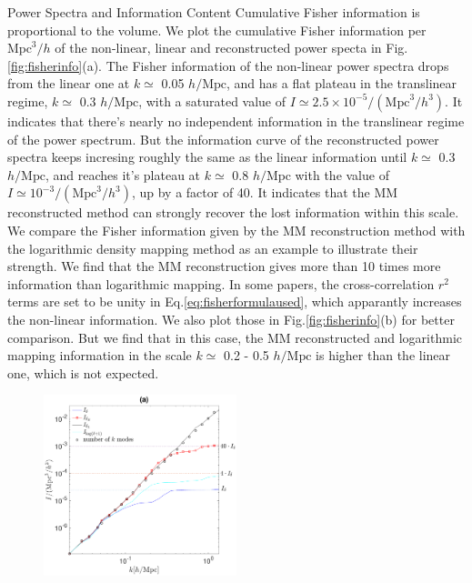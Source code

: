 \begin{section}{Power Spectra and Information Content}
  Cumulative Fisher information is proportional to the volume. We plot the 
cumulative Fisher information per $\mathrm{Mpc}^3/h$ of the non-linear, linear and reconstructed power specta in 
Fig.\ref{fig:fisherinfo}(a). The Fisher information of the non-linear power spectra drops 
from the linear one at $k \simeq$ 0.05 $h/\mathrm{Mpc}$, and has a flat plateau in the translinear regime, 
$k\simeq$ 0.3 $h/\mathrm{Mpc}$, with 
a saturated value of $I \simeq 2.5 \times 10^{-5}/(\mathrm{Mpc}^3/h^3)$. It 
indicates that there's nearly no independent information in the translinear regime of the power 
spectrum.
But the information curve of 
the reconstructed power spectra keeps incresing roughly the same as 
the linear information until $k\simeq$ 0.3 $h/\mathrm{Mpc}$, and reaches it's plateau at $k\simeq$ 0.8 $h/\mathrm{Mpc}$ with the 
value of $I \simeq  10^{-3}/(\mathrm{Mpc}^3/h^3)$, up by a factor of  40. 
It indicates that the MM reconstructed method can strongly recover the lost information 
within this scale. We compare the Fisher information given by the MM reconstruction method with 
the logarithmic density mapping method \cite{bib:Mark2009} as an example to illustrate their strength. 
We find that the MM reconstruction gives more than 10 times more information than logarithmic mapping. 
In some papers, the cross-correlation $r^2$ terms are set to be unity in Eq.\ref{eq:fisherformulaused}, which 
apparantly increases the non-linear information. We also plot those in Fig.\ref{fig:fisherinfo}(b) 
for better comparison. But we find that in this case, the MM reconstructed and logarithmic mapping information in the scale 
$k \simeq$ 0.2 - 0.5 $h/\mathrm{Mpc}$ is higher than the linear one, which is not expected. 
\begin{figure}
  \includegraphics[width=0.5\textwidth]{fisher_r2_best_analysis-crop.pdf}

\end{figure}
\end{section}
